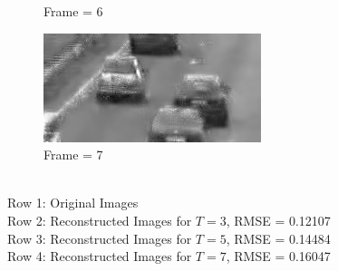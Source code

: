 \documentclass[a4paper, landscape]{article}
\begin{document}
\begin{figure}[H]
\begin{subfigure}{0.13\linewidth}
		\caption{Frame = 6}
	\end{subfigure}
	\begin{subfigure}{0.13\linewidth}
		\centering
		\includegraphics[width=\linewidth]{cars/reconstructed, T = 7, frame = 7.png}
		\caption{Frame = 7}
	\end{subfigure}
	\caption{\\Row 1: Original Images\\Row 2: Reconstructed Images for $T=3$, RMSE = 0.12107\\Row 3: Reconstructed Images for $T=5$, RMSE = 0.14484\\Row 4: Reconstructed Images for $T=7$, RMSE = 0.16047}
	\label{fig:cf}
\end{figure}
\end{document}
